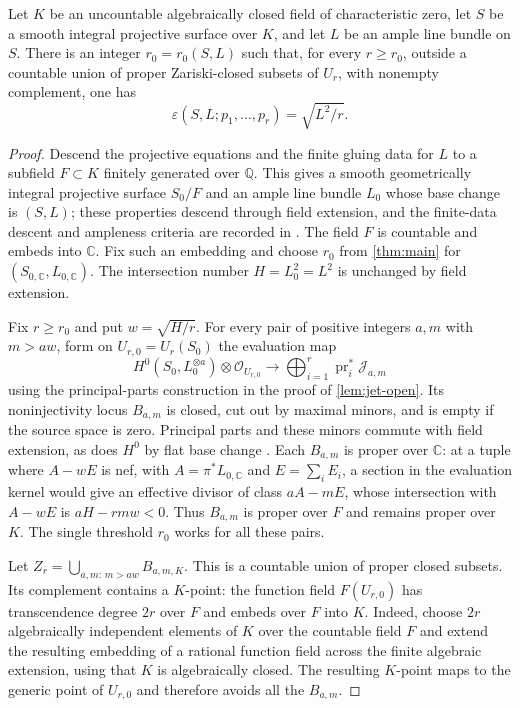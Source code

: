 \begin{corollary}\label{cor:fields}
Let $K$ be an uncountable algebraically closed field of characteristic zero, let $S$ be a smooth integral projective surface over $K$, and let $L$ be an ample line bundle on $S$. There is an integer $r_0=r_0(S,L)$ such that, for every $r\ge r_0$, outside a countable union of proper Zariski-closed subsets of $U_r$, with nonempty complement, one has
\[
 \varepsilon(S,L;p_1,\ldots,p_r)=\sqrt{L^2/r}.
\]
\end{corollary}
\begin{proof}
Descend the projective equations and the finite gluing data for $L$ to a subfield $F\subset K$ finitely generated over $\mathbb{Q}$. This gives a smooth geometrically integral projective surface $S_0/F$ and an ample line bundle $L_0$ whose base change is $(S,L)$; these properties descend through field extension, and the finite-data descent and ampleness criteria are recorded in \cite[Tags \href{https://stacks.math.columbia.edu/tag/01ZM}{01ZM} and \href{https://stacks.math.columbia.edu/tag/0D3C}{0D3C}]{Stacks}. The field $F$ is countable and embeds into $\mathbb{C}$. Fix such an embedding and choose $r_0$ from \cref{thm:main} for $(S_{0,\mathbb{C}},L_{0,\mathbb{C}})$. The intersection number $H=L_0^2=L^2$ is unchanged by field extension.

Fix $r\ge r_0$ and put $w=\sqrt{H/r}$. For every pair of positive integers $a,m$ with $m>aw$, form on $U_{r,0}=U_r(S_0)$ the evaluation map
\[
 H^0(S_0,L_0^{\otimes a})\otimes\mathcal{O}_{U_{r,0}}
 \longrightarrow
 \bigoplus_{i=1}^r\operatorname{pr}_i^*\mathcal{J}_{a,m}
\]
using the principal-parts construction in the proof of \cref{lem:jet-open}. Its noninjectivity locus $B_{a,m}$ is closed, cut out by maximal minors, and is empty if the source space is zero. Principal parts and these minors commute with field extension, as does $H^0$ by flat base change \cite[Tag \href{https://stacks.math.columbia.edu/tag/02KH}{02KH}]{Stacks}. Each $B_{a,m}$ is proper over $\mathbb{C}$: at a tuple where $A-wE$ is nef, with $A=\pi^*L_{0,\mathbb{C}}$ and $E=\sum_iE_i$, a section in the evaluation kernel would give an effective divisor of class $aA-mE$, whose intersection with $A-wE$ is $aH-rmw<0$. Thus $B_{a,m}$ is proper over $F$ and remains proper over $K$. The single threshold $r_0$ works for all these pairs.

Let $Z_r=\bigcup_{a,m:\,m>aw}B_{a,m,K}$. This is a countable union of proper closed subsets. Its complement contains a $K$-point: the function field $F(U_{r,0})$ has transcendence degree $2r$ over $F$ and embeds over $F$ into $K$. Indeed, choose $2r$ algebraically independent elements of $K$ over the countable field $F$ and extend the resulting embedding of a rational function field across the finite algebraic extension, using that $K$ is algebraically closed. The resulting $K$-point maps to the generic point of $U_{r,0}$ and therefore avoids all the $B_{a,m}$.


\end{proof}
